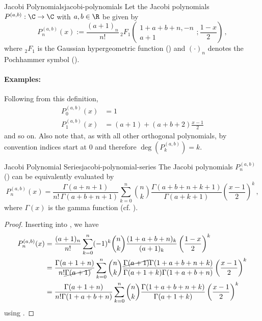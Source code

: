 \begin{definition}{Jacobi Polynomials}{jacobi-polynomials}
  Let the Jacobi polynomials $P^{(a, b)}: \C \to \C$ with $a, b \in \R$ be given by
  $$P^{(a,b)}_n(x) := {\frac{(a +1)_{n}}{n!}}\, {}_2F_1\left(\begin{matrix}1+a +b +n, -n \\a + 1\end{matrix}; \frac{1-x}{2}\right)\,,$$
  where ${}_2F_1$ is the Gaussian hypergeometric function () and $(\cdot)_n$ denotes the Pochhammer symbol ().
\end{definition}

\paragraph{Examples:}
Following from this definition,
\begin{align*}
  P_0^{(a, b)}(x)   & = 1                            \\
  P_{1}^{(a, b)}(x) & = (a+1)+(a+b+2){\frac{x-1}{2}}
\end{align*}
and so on.
Also note that, as with all other orthogonal polynomials, by convention indices start at $0$ and therefore $\deg\left(P_k^{(a, b)}\right) = k$.

\begin{lemma}{Jacobi Polynomial Series}{jacobi-polynomial-series}
  The Jacobi polynomials $P_n^{(a, b)}$ () can be equivalently evaluated by
  $$P_{n}^{(a, b)}(x)={\frac  {\Gamma (a +n+1)}{n!\,\Gamma (a +b +n+1)}}\sum _{{k=0}}^{n}\binom{n}{k}{\frac{\Gamma (a +b +n+k+1)}{\Gamma (a +k+1)}}\left({\frac{x-1}{2}}\right)^{k}\,,$$
  where $\Gamma(x)$ is the gamma function (cf. ).
\end{lemma}
\begin{proof}
  Inserting into , we have
  \begin{align*}
    P_{n}^{(a, b)}(x) & = \frac{(a+1)_n}{n!} \sum_{k=0}^n (-1)^k \binom{n}{k} \frac{(1+a+b+n)_k}{(a+1)_k} \left(\frac{1-x}{2}\right)^k                                                                        \\
                      & = \frac{\Gamma(a+1+n)}{n! \cancel{\Gamma(a+1)}} \sum_{k=0}^n \binom{n}{k} \frac{\cancel{\Gamma(a+1)} \Gamma(1+a+b+n + k)}{\Gamma(a+1+k) \Gamma(1+a+b+n)} \left(\frac{x-1}{2}\right)^k \\
                      & = \frac{\Gamma(a+1+n)}{n! \Gamma(1+a+b+n)} \sum_{k=0}^n \binom{n}{k} \frac{\Gamma(1+a+b+n + k)}{\Gamma(a+1+k) } \left(\frac{x-1}{2}\right)^k
  \end{align*}
  using .
\end{proof}

